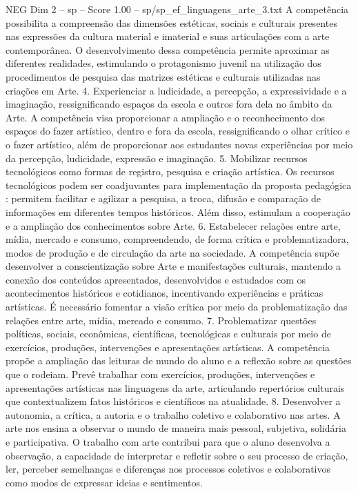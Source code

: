 \begin{textsample}{NEG Dim 2 – sp – Score 1.00 – sp/sp\_ef\_linguagens\_arte\_3.txt}
A competência possibilita a compreensão das dimensões estéticas, sociais e culturais presentes nas expressões da cultura material e imaterial e suas articulações com a arte contemporânea.
O desenvolvimento dessa competência permite aproximar as diferentes realidades, estimulando o protagonismo juvenil na utilização dos procedimentos de pesquisa das matrizes estéticas e culturais utilizadas nas criações em Arte. 4.
Experienciar a ludicidade, a percepção, a expressividade e a imaginação, ressignificando espaços da escola e outros fora dela no âmbito da Arte.
A competência visa proporcionar a ampliação e o reconhecimento dos espaços do fazer artístico, dentro e fora da escola, ressignificando o olhar crítico e o fazer artístico, além de proporcionar aos estudantes novas experiências por meio da percepção, ludicidade, expressão e imaginação. 5.
Mobilizar recursos tecnológicos como formas de registro, pesquisa e criação artística.
Os recursos tecnológicos podem ser coadjuvantes para implementação da proposta pedagógica : permitem facilitar e agilizar a pesquisa, a troca, difusão e comparação de informações em diferentes tempos históricos.
Além disso, estimulam a cooperação e a ampliação dos conhecimentos sobre Arte. 6.
Estabelecer relações entre arte, mídia, mercado e consumo, compreendendo, de forma crítica e problematizadora, modos de produção e de circulação da arte na sociedade.
A competência supõe desenvolver a conscientização sobre Arte e manifestações culturais, mantendo a conexão dos conteúdos apresentados, desenvolvidos e estudados com os acontecimentos históricos e cotidianos, incentivando experiências e práticas artísticas.
É necessário fomentar a visão crítica por meio da problematização das relações entre arte, mídia, mercado e consumo. 7.
Problematizar questões políticas, sociais, econômicas, científicas, tecnológicas e culturais por meio de exercícios, produções, intervenções e apresentações artísticas.
A competência propõe a ampliação das leituras de mundo do aluno e a reflexão sobre as questões que o rodeiam.
Prevê trabalhar com exercícios, produções, intervenções e apresentações artísticas nas linguagens da arte, articulando repertórios culturais que contextualizem fatos históricos e científicos na atualidade. 8.
Desenvolver a autonomia, a crítica, a autoria e o trabalho coletivo e colaborativo nas artes.
A arte nos ensina a observar o mundo de maneira mais pessoal, subjetiva, solidária e participativa.
O trabalho com arte contribui para que o aluno desenvolva a observação, a capacidade de interpretar e refletir sobre o seu processo de criação, ler, perceber semelhanças e diferenças nos processos coletivos e colaborativos como modos de expressar ideias e sentimentos.

\end{textsample}
